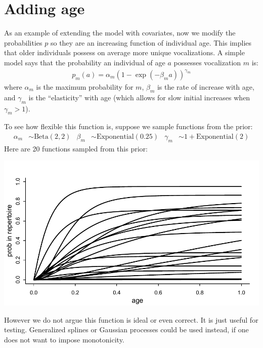 \documentclass[reqno ,11pt]{amsart}
\begin{document}
\section{Adding age}

As an example of extending the model with covariates, now we modify the probabilities $p$ so they are an increasing function of individual age. This implies that older individuals possess on average more unique vocalizations. A simple model says that the probability an individual of age $a$ possesses vocalization $m$ is:
\begin{align*}
	p_m(a) = \alpha_m ( 1 - \exp(-\beta_m a) ) ^{\gamma_m}
\end{align*}
where $\alpha_m$ is the maximum probability for $m$, $\beta_m$ is the rate of increase with age, and $\gamma_m$ is the ``elasticity'' with age (which allows for slow initial increases when $\gamma_m > 1$).

To see how flexible this function is, suppose we sample functions from the prior:
\begin{align*}
	\alpha_m &\sim \text{Beta}(2,2) &
	\beta_m &\sim \text{Exponential}(0.25) &
	\gamma_m &\sim 1 + \text{Exponential}(2)
\end{align*}
Here are 20 functions sampled from this prior:
\begin{center}
	\includegraphics[scale=0.6]{fig_age_prior.pdf}
\end{center}
However we do not argue this function is ideal or even correct. It is just useful for testing. Generalized splines or Gaussian processes could be used instead, if one does not want to impose monotonicity.


\clearpage
 

\end{document}
